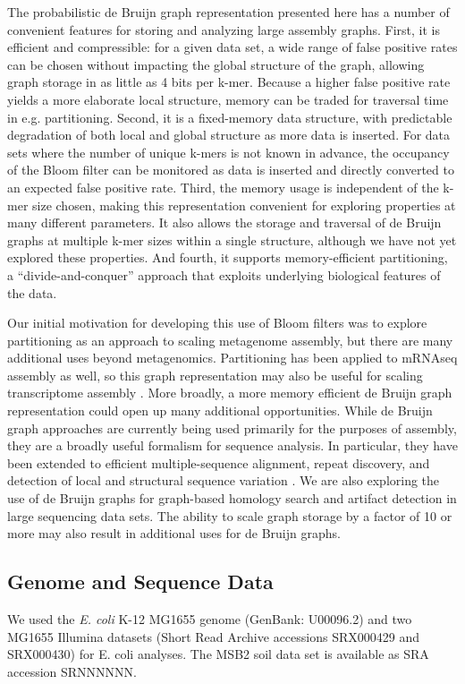 \documentclass{pnastwo}
\begin{document}
\begin{article}
The probabilistic de Bruijn graph representation presented here has a
number of convenient features for storing and analyzing large assembly
graphs.  First, it is efficient and compressible: for a given data
set, a wide range of false positive rates can be chosen without
impacting the global structure of the graph, allowing graph storage in
as little as 4 bits per k-mer.  Because a higher false positive rate
yields a more elaborate local structure, memory can be traded for
traversal time in e.g. partitioning.  Second, it is a fixed-memory
data structure, with predictable degradation of both local and global
structure as more data is inserted.  For data sets where the number of
unique k-mers is not known in advance, the occupancy of the Bloom
filter can be monitored as data is inserted and directly converted
to an expected false positive rate.  Third, the memory usage is
independent of the k-mer size chosen, making this representation
convenient for exploring properties at many different parameters.  It
also allows the storage and traversal of de Bruijn graphs at multiple
k-mer sizes within a single structure, although we have not yet
explored these properties.  And fourth, it supports memory-efficient
partitioning, a ``divide-and-conquer'' approach that exploits underlying biological features of
the data.

Our initial motivation for developing this use of Bloom filters was to
explore partitioning as an approach to scaling metagenome assembly,
but there are many additional uses beyond metagenomics.  Partitioning
has been applied to mRNAseq assembly as well, so this graph representation may also be
useful for scaling transcriptome assembly \cite{trinity}.
More broadly, a more memory efficient de Bruijn graph representation could open up
many additional opportunities.  While de Bruijn graph approaches are currently
being used primarily for the purposes of assembly, they are a broadly
useful formalism for sequence analysis. In particular, they have been
extended to efficient multiple-sequence alignment,
repeat discovery, and detection of local and
structural sequence variation \cite{zerbinothesis,zhang2003dna,price2005novo}.  We are also
exploring the use of de Bruijn graphs for graph-based homology search
and artifact detection in large sequencing data sets.  The ability to
scale graph storage by a factor of 10 or more may also result in
additional uses for de Bruijn graphs.

\begin{materials}

\section{Genome and Sequence Data}
We used the \emph{E. coli} K-12 MG1655 genome (GenBank: U00096.2) and two MG1655 Illumina 
datasets (Short Read Archive accessions SRX000429 and SRX000430) for E. coli
analyses.  The MSB2 soil data set is available as SRA accession SRNNNNNN.


\end{materials}
\end{article}
\end{document}
